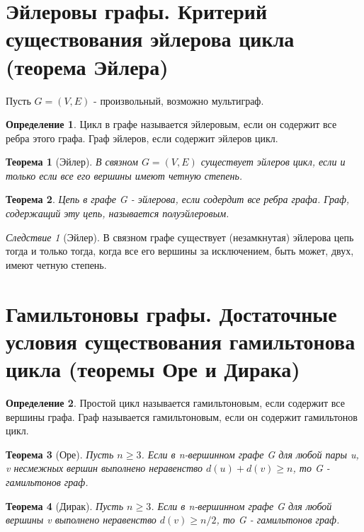 \documentclass[a4paper]{article}
\newtheorem{theorem}{Теорема}[section]
\theoremstyle{definition}
\newtheorem*{definition}{Определение}
\theoremstyle{remark}
\newtheorem*{corollary}{Следствие}
\begin{document}
\begin{multicols*}{2}
    \section{Эйлеровы графы. Критерий существования эйлерова цикла (теорема Эйлера)}
    Пусть $G = (V, E)$ - произвольный, возможно мультиграф.
    \begin{definition}
        Цикл в графе называется эйлеровым, если он содержит все ребра этого графа. Граф эйлеров, если содержит эйлеров цикл.
    \end{definition}
    \begin{theorem}[Эйлер]
        В связном $G = (V, E)$ существует эйлеров цикл, если и только если все его вершины имеют четную степень.
    \end{theorem}
    \begin{theorem}
        Цепь в графе G - эйлерова, если содердит все ребра графа. Граф, содержащий эту цепь, называется полуэйлеровым.
    \end{theorem}
    \begin{corollary}[Эйлер]
        В связном графе существует (незамкнутая) эйлерова цепь тогда и только тогда, когда все его вершины за исключением, быть может, двух, имеют четную степень.
    \end{corollary}
    \section{Гамильтоновы графы. Достаточные условия существования гамильтонова цикла (теоремы 
    Оре и Дирака)}
    \begin{definition}
        Простой цикл называется гамильтоновым, если содержит все вершины графа. Граф называется гамильтоновым, если он содержит гамильтонов цикл.
    \end{definition}
    \begin{theorem}[Оре]
        Пусть $n\geq 3$. Если в n-вершинном графе G для любой пары u, v несмежных вершин выполнено неравенство $d(u)+ d(v)\geq n$, то G - гамильтонов граф.
    \end{theorem}
    \begin{theorem}[Дирак]
        Пусть $n\geq 3$. Если в n-вершинном графе G для любой вершины v выполнено неравенство $d(v)\geq n/2$, то G - гамильтонов граф.
    \end{theorem}

\end{multicols*}
\end{document}
